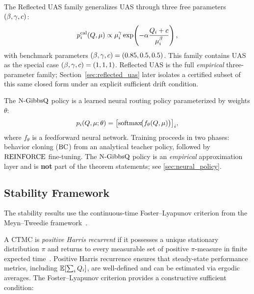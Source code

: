 \begin{definition}
\label{def:reflected_uas}
The Reflected UAS family generalizes UAS through three free parameters $(\beta, \gamma, c)$:
\begin{equation}
\label{eq:reflected_uas}
p_{i}^{\mathrm{cal}}(Q, \mu) \propto \mu_i^{\gamma} \exp\!\left(-\alpha \frac{Q_{i}+c}{\mu_i^{\beta}}\right),
\end{equation}
with benchmark parameters $(\beta, \gamma, c) = (0.85, 0.5, 0.5)$. This family contains UAS as the special case $(\beta, \gamma, c) = (1, 1, 1)$. Reflected UAS is the full \emph{empirical} three-parameter family; Section~\ref{sec:reflected_uas} later isolates a certified subset of this same closed form under an explicit sufficient drift condition.
\end{definition}


\begin{definition}[N-GibbsQ]
\label{def:ngibbsq}
The $\text{N-GibbsQ}$ policy is a learned neural routing policy parameterized by weights $\theta$:
\begin{equation}
\label{eq:ngibbsq}
p_{i}(Q, \mu; \theta) = \bigl[\mathrm{softmax}\!\bigl(f_\theta(Q, \mu)\bigr)\bigr]_i,
\end{equation}
where $f_\theta$ is a feedforward neural network. Training proceeds in two phases: behavior cloning ($\text{BC}$) from an analytical teacher policy, followed by $\text{REINFORCE}$ fine-tuning. The $\text{N-GibbsQ}$ policy is an \emph{empirical} approximation layer and is \textbf{not} part of the theorem statements; see \cref{sec:neural_policy}.
\end{definition}

\subsection{Stability Framework}
\label{sec:model:stability}

The stability results use the continuous-time Foster--Lyapunov criterion from the Meyn--Tweedie framework~\cite{meyn2009markov,asmussen2003applied}.

A CTMC is \emph{positive Harris recurrent} if it possesses a unique stationary distribution $\pi$ and returns to every measurable set of positive $\pi$-measure in finite expected time~\cite{meyn2009markov}.
Positive Harris recurrence ensures that steady-state performance metrics, including $\mathbb{E}[\sum_i Q_{i}]$, are well-defined and can be estimated via ergodic averages.
The Foster--Lyapunov criterion provides a constructive sufficient condition:

